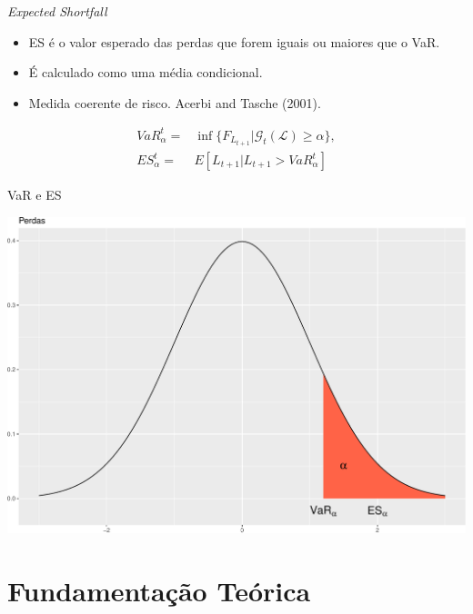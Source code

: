\documentclass[ignorenonframetext,]{beamer}
\providecommand{\tightlist}{%
\setlength{\itemsep}{0pt}\setlength{\parskip}{0pt}}
\begin{document}
\begin{frame}{\emph{Expected Shortfall}}

\begin{itemize}
\tightlist
\item
  ES é o valor esperado das perdas que forem iguais ou maiores que o
  VaR.
\item
  É calculado como uma média condicional.
\item
  Medida coerente de risco. Acerbi and Tasche (2001).
\end{itemize}

\begin{align*}
VaR_\alpha^t=&\inf\{F_{L_{t+1}} | \mathcal{G}_t(\mathcal{L}) \geq \alpha\}, \\
ES_\alpha^t=&E[L_{t+1} | L_{t+1} > VaR_\alpha^t]
\end{align*}

\end{frame}

\begin{frame}{VaR e ES}

\includegraphics{artigo-apresentacao_files/figure-beamer/var-1.pdf}

\end{frame}

\section{Fundamentação Teórica}\label{fundamentacao-teorica}
\end{document}

